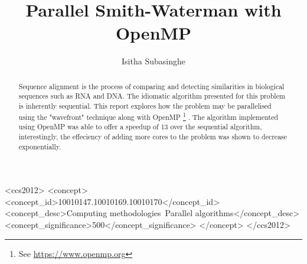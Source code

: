 \documentclass[manuscript,screen, nonacm=true]{acmart}
\begin{document}
\title{Parallel Smith-Waterman with OpenMP}

\author{Isitha Subasinghe}


\renewcommand{\shortauthors}{}

\begin{abstract}
  Sequence alignment is the process of comparing and detecting similarities in biological sequences such as 
  RNA and DNA. The idiomatic algorithm presented for this problem is inherently sequential. This report explores how the problem may be parallelised using the "wavefront" technique along with OpenMP \footnote{See \url{https://www.openmp.org}} . The algorithm implemented using OpenMP was able to offer a speedup of 13 over the sequential algorithm, interestingly, the effeciency of adding more cores to the problem was shown to decrease exponentially. 
\end{abstract}

\begin{CCSXML}
	<ccs2012>
	<concept>
	<concept_id>10010147.10010169.10010170</concept_id>
	<concept_desc>Computing methodologies~Parallel algorithms</concept_desc>
	<concept_significance>500</concept_significance>
	</concept>
	</ccs2012>
\end{CCSXML}



\maketitle
\end{document}
